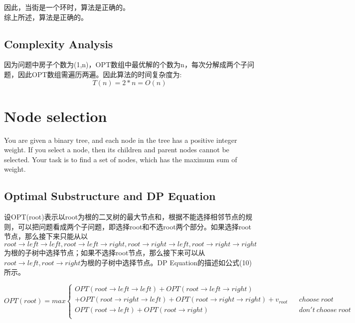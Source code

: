 \documentclass{article}
\begin{document}
\begin{CJK*}{UTF8}{gbsn}
因此，当街是一个环时，算法是正确的。
\\

综上所述，算法是正确的。


\subsection{Complexity Analysis}

因为问题中房子个数为(1,n)，OPT数组中最优解的个数为n，每次分解成两个子问题，因此OPT数组需遍历两遍。因此算法的时间复杂度为:
\begin{equation}
T(n) = 2*n = O(n)
\end{equation}

\newpage
\section{Node selection}

You are given a binary tree, and each node in the tree has a positive integer weight. If you select a node, then its children and parent nodes cannot be selected. Your task is to find a set of nodes, which has the maximum sum of weight.

\subsection{Optimal Substructure and DP Equation}

设OPT(root)表示以root为根的二叉树的最大节点和，根据不能选择相邻节点的规则，可以把问题看成两个子问题，即选择root和不选root两个部分。如果选择root节点，那么接下来只能从以$root\rightarrow left\rightarrow left,root\rightarrow left \rightarrow right,root\rightarrow right\rightarrow left,root\rightarrow right\rightarrow right$为根的子树中选择节点；如果不选择root节点，那么接下来可以从$root\rightarrow left, root\rightarrow right$为根的子树中选择节点。DP Equation的描述如公式(10)所示。

\begin{equation} 
OPT(root)=max\left\{
\begin{array}{lcr}
OPT(root\rightarrow left\rightarrow left) +OPT(root\rightarrow left \rightarrow right)       &      & \\
+OPT(root\rightarrow right\rightarrow left)+OPT(root\rightarrow right\rightarrow right)+v_{root}   &   &  choose\ root\\
OPT(root\rightarrow left)+OPT(root\rightarrow right)     &      & don't\ choose\ root\\


\end{array}
\end{equation}
\end{CJK*}
\end{document}
